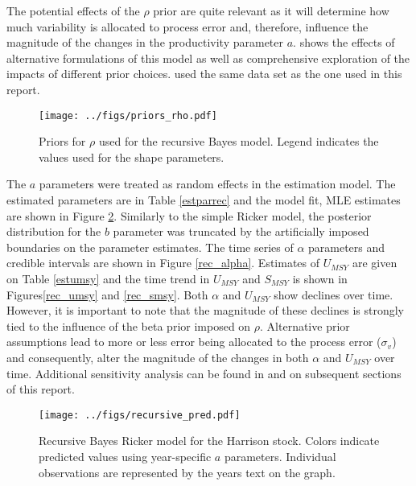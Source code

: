 \documentclass{article}
\begin{document}
The potential effects of the $\rho$ prior are quite relevant as it will determine how much variability is allocated to process error and, therefore, influence the magnitude of the changes in the productivity parameter $a$. \citet{davis_prior_2018} shows the effects of alternative formulations of this model as well as comprehensive exploration of the impacts of different prior choices.  \citet{davis_prior_2018} used the same data set as the one used in this report.   


\begin{figure}[H]
  \centering
  \texttt{[image: ../figs/priors\_rho.pdf]}
  \caption{Priors for $\rho$ used for the recursive Bayes model. Legend indicates the values used for the shape parameters.}
\label{priorrho}
\end{figure}



The $a$ parameters were treated as random effects in the estimation model. The estimated parameters are in Table \ref{estparrec} and the model fit, MLE estimates are shown in Figure \ref{rec_fit}. Similarly to the simple Ricker model, the posterior distribution for the $b$ parameter was truncated by the artificially imposed boundaries on the parameter estimates. The time series of $\alpha$ parameters and credible intervals are shown in Figure \ref{rec_alpha}.  Estimates of $U_{MSY}$ are given on Table \ref{estumsy} and the time trend in $U_{MSY}$ and $S_{MSY}$ is shown in Figures\ref{rec_umsy} and \ref{rec_smsy}. Both $\alpha$ and $U_{MSY}$ show declines over time. However, it is important to note that the magnitude of these declines is strongly tied to the influence of the beta prior imposed on $\rho$. Alternative prior assumptions lead to more or less error being allocated to the process error ($\sigma_v$) and consequently, alter the magnitude of the changes in both $\alpha$ and $U_{MSY}$ over time. Additional sensitivity analysis can be found in \citet{davis_prior_2018} and on subsequent sections of this report.  











\begin{figure}[h]
  \centering
  \texttt{[image: ../figs/recursive\_pred.pdf]}
  \caption{Recursive Bayes Ricker model for the Harrison stock. Colors indicate predicted values using year-specific $a$ parameters. Individual observations are represented by the years text on the graph.}
\label{rec_fit}
\end{figure}
\end{document}

